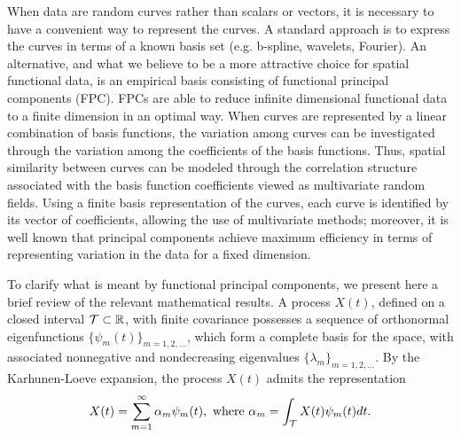 
When data are random curves rather than scalars or vectors, it is necessary to have a convenient way to represent the curves.  A standard approach is to express the curves in terms of a known basis set (e.g. b-spline, wavelets, Fourier). An alternative, and what we believe to be a more attractive choice for spatial functional data, is an empirical basis consisting of functional principal components (FPC). FPCs are able to reduce infinite dimensional functional data to a finite dimension in an optimal way. When curves are represented by a linear combination of basis functions, the variation among curves can be investigated through the variation among the coefficients of the basis functions. Thus, spatial similarity between curves can be modeled through the correlation structure associated with the basis function coefficients viewed as multivariate random fields. Using a finite basis representation of the curves, each curve is identified by its vector of coefficients, allowing the use of multivariate methods; moreover, it is well known that principal components achieve maximum efficiency in terms of representing variation in the data for a fixed dimension. 

To clarify what is meant by functional principal components, we present here a brief review of the relevant mathematical results.
A process $X(t)$, defined on a closed interval $\mathcal{T}  \subset  \mathbb{R} $,  with finite covariance possesses a sequence of orthonormal eigenfunctions $\{\psi_m(t)\}_{m=1,2,\ldots}$, which form a complete basis for the space, with associated nonnegative and nondecreasing eigenvalues $\{\lambda_m \}_{m=1,2,\ldots}$. By the Karhunen-Loeve expansion, the process $X(t)$ admits the representation
\begin{equation*}
X(t) =  \sum_{m=1}^{\infty}\alpha_m \psi_m(t), \mbox{ where  } \alpha_m = \int_{\mathcal{T}} X(t) \psi_m(t)dt.
\end{equation*}

